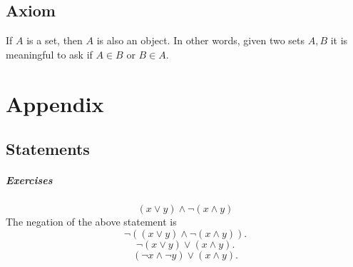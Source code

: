 \documentclass{report}
\begin{document}
\section{Axiom}
If  $A$ is a set, then $A$ is also an object. In other words, given two sets $A,B$ it is meaningful to ask if $A \in B$ or $B \in A$.















































































\chapter*{Appendix}
\section{Statements}
\paragraph{Exercises}
\subsection{}
\[
	(x \lor y ) \land \neg (x \land y)
\] 
The negation of the above statement is
\[
\lnot ((x \lor y) \land \neg (x \land y))
.\] 
\[
\lnot (x \lor y) \lor  (x \land y)
.\]
\[
(\neg x \land \neg y) \lor (x \land y)
.\]
\end{document}
